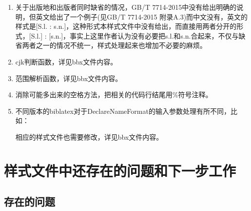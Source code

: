 \begin{enumerate}

  \item 关于出版地和出版者同时缺省的情况，GB/T 7714-2015中没有给出明确的说明，但英文给出了一个例子(见GB/T 7714-2015 附录A.3)而中文没有，英文的样式是[S.l. : s.n.]，这种形式本样式文件中没有给出，而直接用两者分开的形式，[S.l.] : [s.n.]，事实上这里作者认为没有必要把s.l.和s.n.合起来，不仅与缺省两者之一的情况不统一，样式处理起来也增加不必要的麻烦。

  \item cjk判断函数，详见bbx文件内容。

  \item 范围解析函数，详见bbx文件内容。

  \item 消除可能多出来的空格方法，把相关的代码行结尾用\%符号注释。

  \item 不同版本的biblatex对于DeclareNameFormat的输入参数处理有所不同，比如：

相应的样式文件也需要修改，详见bbx文件内容。

\end{enumerate}


\section{样式文件中还存在的问题和下一步工作}
\subsection{存在的问题}

